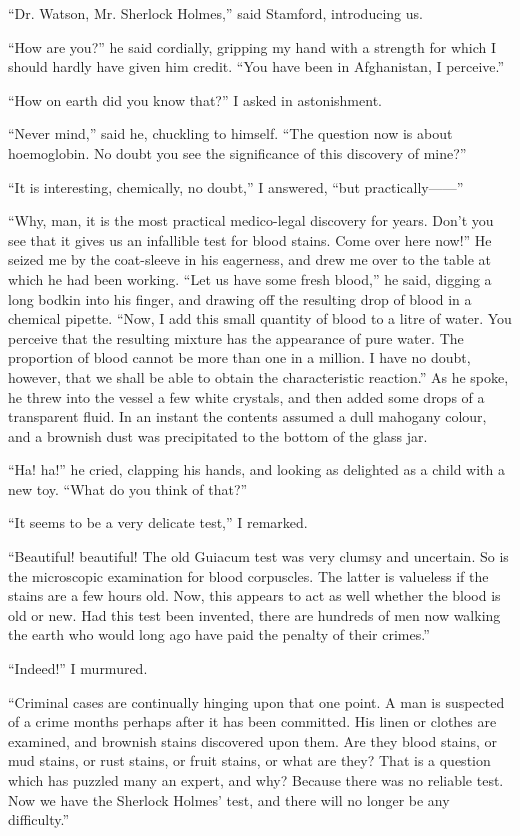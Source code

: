 \documentclass[12pt]{book}
\begin{document}
“Dr. Watson, Mr. Sherlock Holmes,” said Stamford, introducing us. 

“How are you?” he said cordially, gripping my hand with a strength for which I should hardly have given him credit. “You have been in Afghanistan, I perceive.” 

“How on earth did you know that?” I asked in astonishment. 

“Never mind,” said he, chuckling to himself. “The question now is about hoemoglobin. No doubt you see the significance of this discovery of mine?” 

“It is interesting, chemically, no doubt,” I answered, “but practically——” 

“Why, man, it is the most practical medico-legal discovery for years. Don’t you see that it gives us an infallible test for blood stains. Come over here now!” He seized me by the coat-sleeve in his eagerness, and drew me over to the table at which he had been working. “Let us have some fresh blood,” he said, digging a long bodkin into his finger, and drawing off the resulting drop of blood in a chemical pipette. “Now, I add this small quantity of blood to a litre of water. You perceive that the resulting mixture has the appearance of pure water. The proportion of blood cannot be more than one in a million. I have no doubt, however, that we shall be able to obtain the characteristic reaction.” As he spoke, he threw into the vessel a few white crystals, and then added some drops of a transparent fluid. In an instant the contents assumed a dull mahogany colour, and a brownish dust was precipitated to the bottom of the glass jar. 

“Ha! ha!” he cried, clapping his hands, and looking as delighted as a child with a new toy. “What do you think of that?” 

“It seems to be a very delicate test,” I remarked. 

“Beautiful! beautiful! The old Guiacum test was very clumsy and uncertain. So is the microscopic examination for blood corpuscles. The latter is valueless if the stains are a few hours old. Now, this appears to act as well whether the blood is old or new. Had this test been invented, there are hundreds of men now walking the earth who would long ago have paid the penalty of their crimes.” 

“Indeed!” I murmured. 

“Criminal cases are continually hinging upon that one point. A man is suspected of a crime months perhaps after it has been committed. His linen or clothes are examined, and brownish stains discovered upon them. Are they blood stains, or mud stains, or rust stains, or fruit stains, or what are they? That is a question which has puzzled many an expert, and why? Because there was no reliable test. Now we have the Sherlock Holmes’ test, and there will no longer be any difficulty.” 
\end{document}
